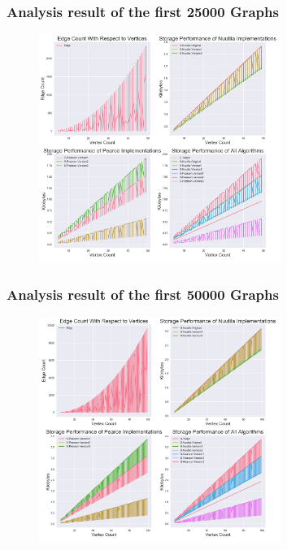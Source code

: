 \documentclass{beamer}
\begin{document}
			\begin{frame}
				\frametitle{Analysis result of the first 25000 Graphs}
				\begin{figure}[h!]
					\centering
					\includegraphics[width=0.7\textwidth]{S25000}
				\end{figure}
			\end{frame}
			\begin{frame}
				\frametitle{Analysis result of the first 50000 Graphs}
				\begin{figure}[h!]
					\centering
					\includegraphics[width=0.7\textwidth]{S50000}
				\end{figure}
			\end{frame}
\end{document}
